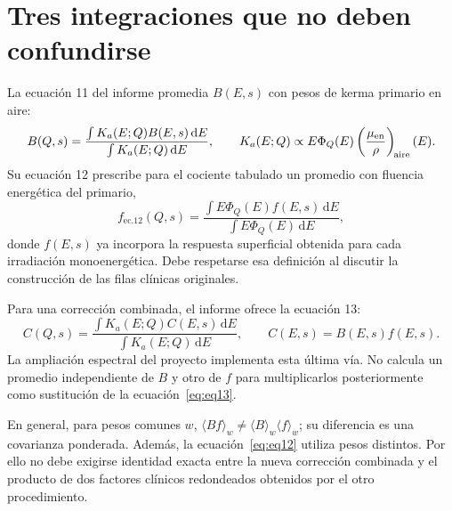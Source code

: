 \section{Tres integraciones que no deben confundirse}
La ecuación 11 del informe promedia $B(E,s)$ con pesos de kerma primario en aire:
\begin{equation}\label{eq:meanB}
B(Q,s)=\frac{\int K_a(E;Q)B(E,s)\,\mathrm dE}{\int K_a(E;Q)\,\mathrm dE},
\qquad K_a(E;Q)\propto E\Phi_Q(E)\left(\frac{\mu_{\mathrm{en}}}{\rho}\right)_{\!\mathrm{aire}}(E).
\end{equation}
Su ecuación 12 prescribe para el cociente tabulado un promedio con fluencia energética del primario,
\begin{equation}\label{eq:eq12}
f_{\mathrm{ec.12}}(Q,s)=\frac{\int E\Phi_Q(E) f(E,s)\,\mathrm dE}{\int E\Phi_Q(E)\,\mathrm dE},
\end{equation}
donde $f(E,s)$ ya incorpora la respuesta superficial obtenida para cada irradiación monoenergética. Debe respetarse esa definición al discutir la construcción de las filas clínicas originales.

Para una corrección combinada, el informe ofrece la ecuación 13:
\begin{equation}\label{eq:eq13}
C(Q,s)=\frac{\int K_a(E;Q)C(E,s)\,\mathrm dE}{\int K_a(E;Q)\,\mathrm dE},
\qquad C(E,s)=B(E,s)f(E,s).
\end{equation}
La ampliación espectral del proyecto implementa esta última vía. No calcula un promedio independiente de $B$ y otro de $f$ para multiplicarlos posteriormente como sustitución de la ecuación~\eqref{eq:eq13}.

En general, para pesos comunes $w$, $\langle Bf\rangle_w\neq\langle B\rangle_w\langle f\rangle_w$; su diferencia es una covarianza ponderada. Además, la ecuación~\eqref{eq:eq12} utiliza pesos distintos. Por ello no debe exigirse identidad exacta entre la nueva corrección combinada y el producto de dos factores clínicos redondeados obtenidos por el otro procedimiento.

